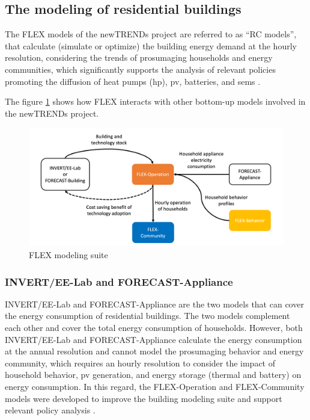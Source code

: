 \subsection{The modeling of residential buildings}


The FLEX models of the newTRENDs project are referred to as “RC models”,
that calculate (simulate or optimize) the building energy demand at the hourly resolution,
considering the trends of prosumaging households and energy communities, 
which significantly supports the analysis of relevant policies promoting the diffusion of heat pumps (\gls{hp}), \gls{pv}, batteries, and \gls{sems} \cite{newtrends}.


The figure \ref{fig:flex} shows how FLEX interacts with other bottom-up models involved in the newTRENDs project.

\begin{figure}[h]
  \centering
  \includegraphics[width=\textwidth]{Images/flex.png}
  \caption{FLEX modeling suite}
  \label{fig:flex}
\end{figure}


\subsubsection{INVERT/EE-Lab and FORECAST-Appliance}


INVERT/EE-Lab and FORECAST-Appliance are the two models that can cover the energy consumption of residential buildings. The two models complement each other and cover the total energy consumption of households. 
However, both INVERT/EE-Lab and FORECAST-Appliance calculate the energy consumption at the annual resolution and cannot model the prosumaging behavior and energy community, which requires an hourly resolution to consider the impact of household behavior, \gls{pv} generation, and energy storage (thermal and battery) on energy consumption. 
In this regard, the FLEX-Operation and FLEX-Community models were developed to improve the building modeling suite and support relevant policy analysis \cite{newtrends}. 


